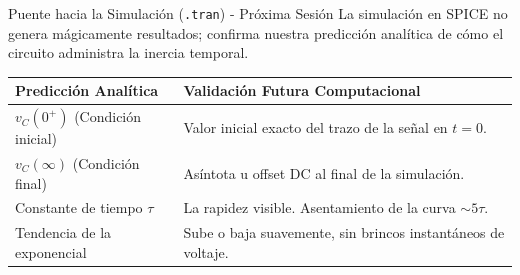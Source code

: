 \documentclass[aspectratio=169, 10pt]{beamer}
\begin{document}
\begin{frame}{Puente hacia la Simulación (\texttt{.tran}) - Próxima Sesión}
    La simulación en SPICE no genera mágicamente resultados; confirma nuestra predicción analítica de cómo el circuito administra la inercia temporal.
    
    \vspace{0.4cm}
    \renewcommand{\arraystretch}{1.5}
    \begin{tabular}{p{4.5cm} p{8cm}}
    \toprule
    \textbf{Predicción Analítica} & \textbf{Validación Futura Computacional} \\ 
    \midrule
    $v_C(0^+)$ (Condición inicial) & Valor inicial exacto del trazo de la señal en $t=0$. \\ 
    $v_C(\infty)$ (Condición final) & Asíntota u offset DC al final de la simulación. \\ 
    Constante de tiempo $\tau$ & La rapidez visible. Asentamiento de la curva $\sim 5\tau$. \\ 
    Tendencia de la exponencial & Sube o baja suavemente, sin brincos instantáneos de voltaje. \\ 
    \bottomrule
    \end{tabular}
\end{frame}
\end{document}
